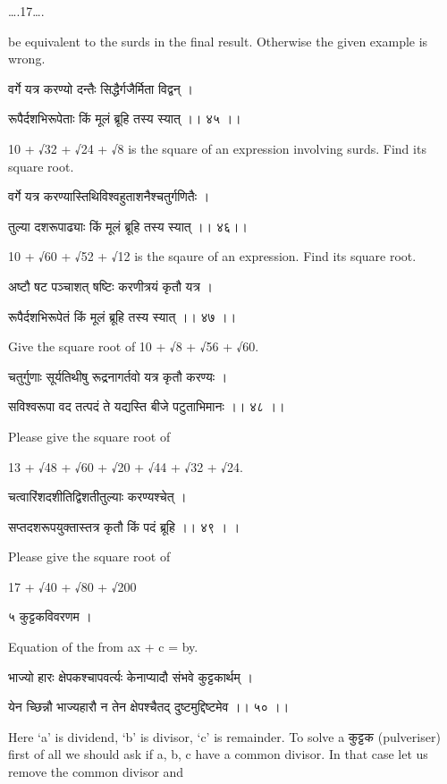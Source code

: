 \documentclass[]{article}
\date{}
\begin{document}
{\ldots{}.17\ldots{}.}

{be equivalent to the surds in the final result. Otherwise the given
example is wrong.}

{वर्गे यत्र करण्यो दन्तैः सिद्धैर्गजैर्मिता विद्वन् । }

{रूपैर्दशभिरूपेताः किं मूलं ब्रूहि तस्य स्यात् ।। ४५ ।। }

{10 + }{√}{32 + }{√}{24 + }{√}{8 is the square of an expression
involving surds. Find its square root.}

{वर्गे यत्र करण्यास्तिथिविश्वहुताशनैश्चतुर्गणितैः । }

{तुल्या दशरूपाढ्याः किं मूलं ब्रूहि तस्य स्यात् ।। ४६।। }

{10 + }{√}{60 + }{√}{52 + }{√}{12 is the sqaure of an expression. Find
its square root.}

{अष्टौ षट पञ्चाशत् षष्टिः करणीत्रयं कृतौ यत्र । }

{रूपैर्दशभिरूपेतं किं मूलं ब्रूहि तस्य स्यात् ।। ४७ ।। }

{Give the square root of 10 + }{√}{8 + }{√}{56 + }{√}{60.}

{चतुर्गुणाः सूर्यतिथीषु रूद्रनागर्तवो यत्र कृतौ करण्यः । }

{सविश्वरूपा वद तत्पदं ते यद्यस्ति बीजे पटुताभिमानः ।। ४८ ।। }

{Please give the square root of }

{13 + }{√}{48 + }{√}{60 + }{√}{20 + }{√}{44 + }{√}{32 + }{√}{24.}

{चत्वारिंशदशीतिद्विशतीतुल्याः करण्यश्चेत् । }

{सप्तदशरूपयुक्तास्तत्र कृतौ किं पदं ब्रूहि ।। ४९ । । }

{Please give the square root of }

{17 + }{√}{40 + }{√}{80 + }{√}{200}

{५ कुट्टकविवरणम । }

{Equation of the from ax + c = by.}

{भाज्यो हारः क्षेपकश्चापवर्त्यः केनाप्यादौ संभवे कुट्टकार्थम् । }

{येन च्छिन्नौ भाज्यहारौ न तेन क्षेपश्चैतद् दुष्टमुद्दिष्टमेव ।। ५० ।। }

{Here `a' is dividend, `b' is divisor, `c' is remainder. To solve a
कुट्टक (pulveriser) first of all we should ask if a, b, c have a common
divisor. In that case let us remove the common divisor and\\
}
\end{document}
